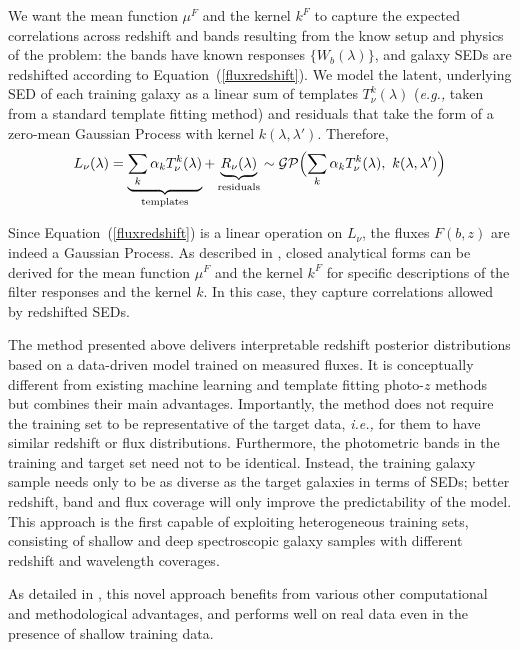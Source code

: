 \documentclass[9pt, conference, a4paper]{IEEEtran}
\newcommand{\equref}[1]{\xspace Equation~(\ref{#1})}
\newcommand{\ie}{\textit{i.e.,}\xspace}
\newcommand{\eg}{\textit{e.g.,}\xspace}
\newcommand{\eqn}[1]{\begin{eqnarray}#1\end{eqnarray}}
\begin{document}
We want the mean function $\mu^F$ and the kernel $k^F$ to capture the expected correlations across redshift and bands resulting from the know setup and physics of the problem: the bands have known responses $\{ W_b(\lambda)\}$, and galaxy SEDs are redshifted according to \equref{fluxredshift}.  We model the latent, underlying SED of each training galaxy as a linear sum of templates $T^k_\nu(\lambda)$ (\eg taken from a standard template fitting method) and residuals that take the form of a  zero-mean Gaussian Process with kernel $k(\lambda, \lambda')$. Therefore, 
\eqn{
	L_\nu(\lambda) = \underbrace{\sum_k \alpha_k T^k_\nu(\lambda)}_\mathrm{templates} + \underbrace{R_\nu(\lambda)}_\mathrm{residuals}  \sim \mathcal{GP}\Bigl(\sum_k \alpha_k T^k_\nu(\lambda), \ k(\lambda, \lambda')\Bigr)\nonumber
	}

Since \equref{fluxredshift} is a linear operation on $L_\nu$, the fluxes $F(b, z)$ are indeed a Gaussian Process. As described in \cite{LeistedtHogg:2016}, closed analytical forms can be derived for the mean function $\mu^F$ and the kernel $k^F$ for specific descriptions of the filter responses and the kernel $k$. In this case, they capture correlations allowed by redshifted SEDs.

The method presented above delivers interpretable redshift posterior distributions based on a data-driven model trained on measured fluxes. It is conceptually different from existing machine learning and template fitting photo-$z$ methods but combines their main advantages. Importantly, the method does not require the training set to be representative of the target data, \ie for them to have similar redshift or flux distributions. Furthermore, the photometric bands in the training and target set need not to be identical. Instead, the training galaxy sample needs only to be as diverse as the target galaxies in terms of SEDs; better redshift, band and flux coverage will only improve the predictability of the model. This approach is the first capable of exploiting heterogeneous training sets, consisting of shallow and deep spectroscopic galaxy samples with different redshift and wavelength coverages.

As detailed in \cite{LeistedtHogg:2016}, this novel approach benefits from various other computational and methodological advantages, and performs well on real data even in the presence of shallow training data. 



\end{document}
